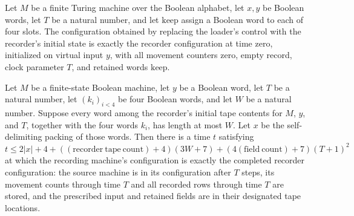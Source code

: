 \begin{lemma}
\label{Complexity.clRecord_prepare_frame}
\leanok
{}
Let $M$ be a finite Turing machine over the Boolean alphabet, let $x,y$ be Boolean
words, let $T$ be a natural number, and let $\mathrm{keep}$ assign a Boolean word to
each of four slots. The configuration obtained by replacing the loader's control with
the recorder's initial state is exactly the recorder configuration at time zero,
initialized on virtual input $y$, with all movement counters zero, empty record, clock
parameter $T$, and retained words $\mathrm{keep}$.
\end{lemma}

\begin{lemma}
\label{Complexity.clRecord_complete}
\leanok
{}
Let $M$ be a finite-state Boolean machine, let $y$ be a Boolean word, let $T$ be a
natural number, let $(k_i)_{i<4}$ be four Boolean words, and let $W$ be a natural
number. Suppose every word among the recorder's initial tape contents for $M$, $y$, and
$T$, together with the four words $k_i$, has length at most $W$. Let $x$ be the
self-delimiting packing of those words. Then there is a time $t$ satisfying $t\le
2|x|+4+((\mathrm{recorder\ tape\ count})+4)(3W+7)+(4(\mathrm{field\ count})+7)(T+1)^2$
at which the recording machine's configuration is exactly the completed recorder
configuration: the source machine is in its configuration after $T$ steps, its movement
counts through time $T$ and all recorded rows through time $T$ are stored, and the
prescribed input and retained fields are in their designated tape locations.
\end{lemma}

